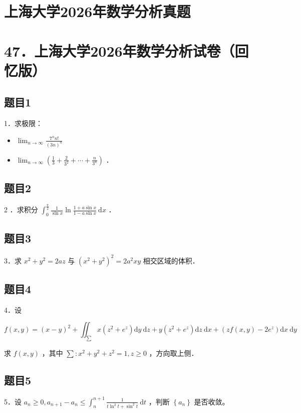 \documentclass{article}
\begin{document}
\section*{上海大学2026年数学分析真题}
\section*{47．上海大学2026年数学分析试卷（回忆版）}

\subsection{题目1}
1．求极限：

\begin{itemize}
  \item[（1）] \(\lim _{n \rightarrow \infty} \frac{7^{n} n!}{(3 n)^{n}}\)
  \item[（2）] \(\lim _{n \rightarrow \infty}\left(\frac{1}{3}+\frac{2}{3^{2}}+\cdots+\frac{n}{3^{n}}\right)\) ．
\end{itemize}

\subsection{题目2}
2 ．求积分 \(\int_{0}^{\frac{\pi}{2}} \frac{1}{\sin x} \ln \frac{1+a \sin x}{1-a \sin x} \mathrm{~d} x\) ．

\subsection{题目3}
3．求 \(x^{2}+y^{2}=2 a z\) 与 \(\left(x^{2}+y^{2}\right)^{2}=2 a^{2} x y\) 相交区域的体积．

\subsection{题目4}
4．设

\[
f(x, y)=(x-y)^{2}+\iint_{\sum} x\left(z^{2}+e^{z}\right) \mathrm{d} y \mathrm{~d} z+y\left(z^{2}+e^{z}\right) \mathrm{d} z \mathrm{~d} x+\left(z f(x, y)-2 e^{z}\right) \mathrm{d} x \mathrm{~d} y
\]

求 \(f(x, y)\) ，其中 \(\sum: x^{2}+y^{2}+z^{2}=1, z \geq 0\) ，方向取上侧．

\subsection{题目5}
5．设 \(a_{n} \geq 0, a_{n+1}-a_{n} \leq \int_{n}^{n+1} \frac{1}{t \ln ^{2} t+\sin ^{2} t} \mathrm{~d} t\) ，判断 \(\left\{a_{n}\right\}\) 是否收敛。
\end{document}

